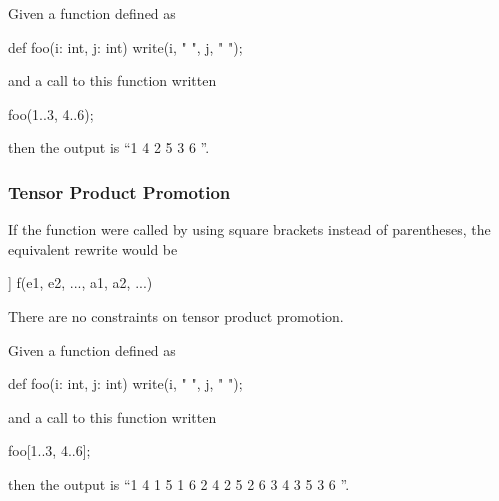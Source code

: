 \begin{example}
Given a function defined as
\begin{chapel}
def foo(i: int, j: int) {
  write(i, " ", j, " ");
}
\end{chapel}
and a call to this function written
\begin{chapel}
foo(1..3, 4..6);
\end{chapel}
then the output is ``1 4 2 5 3 6 ''.
\end{example}

\subsubsection{Tensor Product Promotion}
\label{Tensor_Product_Promotion}

If the function  were called by using square brackets instead
of parentheses, the equivalent rewrite would be
\begin{chapel}
[(e1, e2, ...) in [s1, s2, ...]] f(e1, e2, ..., a1, a2, ...)
\end{chapel}
There are no constraints on tensor product promotion.

\begin{example}
Given a function defined as
\begin{chapel}
def foo(i: int, j: int) {
  write(i, " ", j, " ");
}
\end{chapel}
and a call to this function written
\begin{chapel}
foo[1..3, 4..6];
\end{chapel}
then the output is ``1 4 1 5 1 6 2 4 2 5 2 6 3 4 3 5 3 6 ''.
\end{example}
